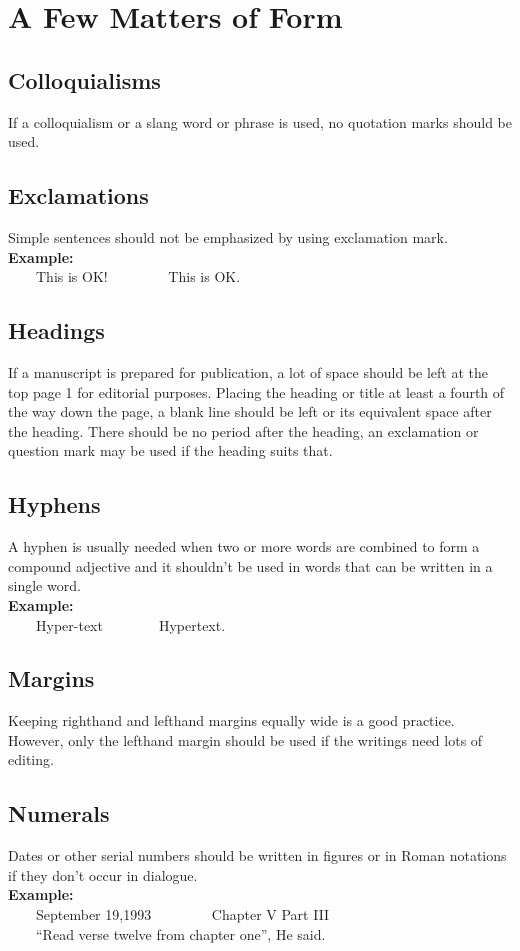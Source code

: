 \documentclass{report}
\newcommand{\xmpl}{\textbf{Example:}\\} %
\newcommand{\indnt}{\ \ \ \ } %
\begin{document}
\chapter{A Few Matters of Form}
\section{Colloquialisms}
If a colloquialism or a slang word or phrase is used, no quotation marks should be used.

\section{Exclamations}
Simple sentences should not be emphasized by using exclamation mark.\\
\xmpl
\indnt This is OK! \indnt \indnt This is OK.

\section{Headings}
If a manuscript is prepared for publication, a lot of space should be left at the top page 1 for editorial purposes. Placing the heading or title at least a fourth of the way down the page, a blank line should be left or its equivalent space after the heading. There should be no period after the heading, an exclamation or question mark may be used if the heading suits that.

\section{Hyphens}
A hyphen is usually needed when two or more words are combined to form a compound adjective and it shouldn't be used in words that can be written in a single word.\\
\xmpl
\indnt Hyper-text\indnt \indnt Hypertext.
\section{Margins}
Keeping righthand and lefthand margins equally wide is a good practice. However, only the lefthand margin should be used if the writings need lots of editing.
\section{Numerals}
Dates or other serial numbers should be written in figures or in Roman notations if they don't occur in dialogue.\\
\xmpl
\indnt September 19,1993 \indnt \indnt Chapter V Part III\\
\indnt ``Read verse twelve from chapter one'', He said.
\end{document}
